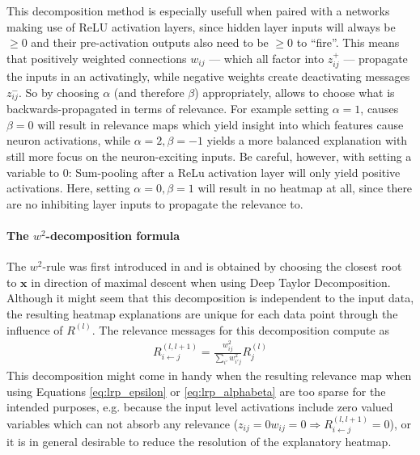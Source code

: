 \documentclass[a4wide]{article}
\newcommand{\x}{\boldsymbol{x}}
\begin{document}
This decomposition method is especially usefull when paired with a networks making use of ReLU activation layers, since hidden layer inputs will always be $\geq 0$ and their pre-activation outputs also need to be $\geq 0$ to ``fire''. This means that positively weighted connections $w_{ij}$ --- which all factor into $z_{ij}^+$ --- propagate the inputs in an activatingly, while negative weights create deactivating messages $z_{ij}^-$. So by choosing $\alpha$ (and therefore $\beta$) appropriately, allows to choose what is backwards-propagated in terms of relevance. For example setting $\alpha = 1$, causes $\beta = 0$ will result in relevance maps which yield insight into which features cause neuron activations, while $\alpha=2, \beta=-1$ yields a more balanced explanation with still more focus on the neuron-exciting inputs. Be careful, however, with setting a variable to 0: Sum-pooling after a ReLu activation layer will only yield positive activations. Here, setting $\alpha=0,\beta=1$ will result in no heatmap at all, since there are no inhibiting layer inputs to propagate the relevance to.

\paragraph{The $w^2$-decomposition formula}
The $w^2$-rule was first introduced in \cite{MonArXiv16} and is obtained by choosing the closest root to $\x$ in direction of maximal descent when using Deep Taylor Decomposition. Although it might seem that this decomposition is independent to the input data, the resulting heatmap explanations are unique for each data point through the influence of $R^{(l)}$. The relevance messages for this decomposition compute as
\begin{align}
R^{(l,l+1)}_{i\leftarrow j} = \frac{w_{ij}^2}{\sum\limits_{i'} w_{i'j}^2}R^{(l)}_{j}
\label{eq:lrp_ww}
\end{align}
This decomposition might come in handy when the resulting relevance map when using Equations \ref{eq:lrp_epsilon} or \ref{eq:lrp_alphabeta} are too sparse for the intended purposes, e.g. because the input level activations include zero valued variables which can not absorb any relevance ($z_{ij} = 0w_{ij} = 0 \Rightarrow R^{(l,l+1)}_{i\leftarrow j} = 0$), or it is in general desirable to reduce the resolution of the explanatory heatmap.
\end{document}
